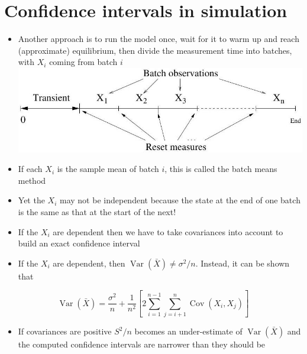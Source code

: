\documentclass[10pt]{article}
\begin{document}
\section*{Confidence intervals in simulation}
\begin{itemize}
  \item Another approach is to run the model once, wait for it to warm up and reach (approximate) equilibrium, then divide the measurement time into batches, with $X_{i}$ coming from batch $i$\\
\includegraphics[max width=\textwidth, center]{2025_05_12_520db7cd238ba7b44f0fg-26}
  \item If each $X_{i}$ is the sample mean of batch $i$, this is called the batch means method
  \item Yet the $X_{i}$ may not be independent because the state at the end of one batch is the same as that at the start of the next!
  \item If the $X_{i}$ are dependent then we have to take covariances into account to build an exact confidence interval
  \item If the $X_{i}$ are dependent, then $\operatorname{Var}(\bar{X}) \neq \sigma^{2} / n$. Instead, it can be shown that
\end{itemize}

$$
\operatorname{Var}(\bar{X})=\frac{\sigma^{2}}{n}+\frac{1}{n^{2}}\left[2 \sum_{i=1}^{n-1} \sum_{j=i+1}^{n} \operatorname{Cov}\left(X_{i}, X_{j}\right)\right]
$$

\begin{itemize}
  \item If covariances are positive $S^{2} / n$ becomes an under-estimate of $\operatorname{Var}(\bar{X})$ and the computed confidence intervals are narrower than they should be
\end{itemize}
\end{document}
